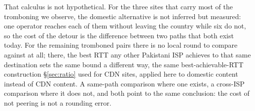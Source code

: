 \documentclass[sigconf,anonymous,10pt]{acmart}
\begin{document}


That calculus is not hypothetical. For the three sites that carry most of the tromboning we observe, the domestic alternative is not inferred but measured: one operator reaches each of them without leaving the country while six do not, so the cost of the detour is the difference between two paths that both exist today. For the remaining tromboned pairs there is no local round to compare against at all; there, the best RTT any other Pakistani ISP achieves to that same destination sets the same bound a different way, the same best-achievable-RTT construction \S\ref{sec:ratio} used for CDN sites, applied here to domestic content instead of CDN content. A same-path comparison where one exists, a cross-ISP comparison where it does not, and both point to the same conclusion: the cost of not peering is not a rounding error. 
\end{document}
